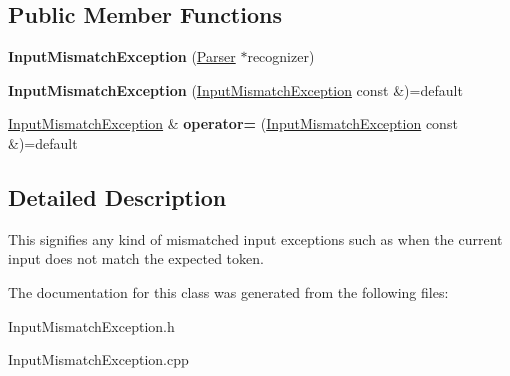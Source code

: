 \subsection*{Public Member Functions}
\begin{DoxyCompactItemize}
\item 
\mbox{\label{classantlr4_1_1InputMismatchException_a062bc352734d1004350808770cac1bc0}} 
{\bfseries Input\+Mismatch\+Exception} (\hyperlink{classantlr4_1_1Parser}{Parser} $\ast$recognizer)
\item 
\mbox{\label{classantlr4_1_1InputMismatchException_a095898a25ece943c1c52d4d9d0870cf2}} 
{\bfseries Input\+Mismatch\+Exception} (\hyperlink{classantlr4_1_1InputMismatchException}{Input\+Mismatch\+Exception} const \&)=default
\item 
\mbox{\label{classantlr4_1_1InputMismatchException_a62cec469da50167dac4f0e250c4172ad}} 
\hyperlink{classantlr4_1_1InputMismatchException}{Input\+Mismatch\+Exception} \& {\bfseries operator=} (\hyperlink{classantlr4_1_1InputMismatchException}{Input\+Mismatch\+Exception} const \&)=default
\end{DoxyCompactItemize}


\subsection{Detailed Description}
This signifies any kind of mismatched input exceptions such as when the current input does not match the expected token. 



The documentation for this class was generated from the following files\+:\begin{DoxyCompactItemize}
\item 
Input\+Mismatch\+Exception.\+h\item 
Input\+Mismatch\+Exception.\+cpp\end{DoxyCompactItemize}
